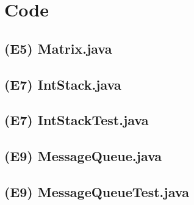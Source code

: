 \documentclass[main.tex]{subfiles}
\begin{document}
\section*{Code}

\subsection*{(E5) Matrix.java}

\newpage
\subsection*{(E7) IntStack.java}

\newpage
\subsection*{(E7) IntStackTest.java}

\newpage
\subsection*{(E9) MessageQueue.java}

\newpage
\subsection*{(E9) MessageQueueTest.java}

\end{document}
